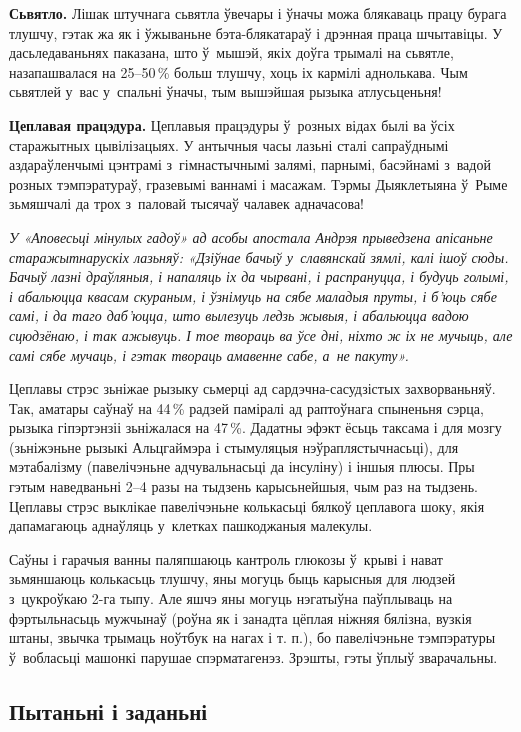 \textbf{Сьвятло.} Лішак штучнага сьвятла ўвечары і ўначы можа блякаваць працу бурага тлушчу, гэтак жа як і ўжываньне бэта-блякатараў і дрэнная праца шчытавіцы. У дасьледаваньнях паказана, што ў~мышэй, якіх доўга трымалі на сьвятле, назапашвалася на 25--50\,\% больш тлушчу, хоць іх кармілі аднолькава. Чым сьвятлей у~вас у~спальні ўначы, тым вышэйшая рызыка атлусьценьня!

\textbf{Цеплавая працэдура.} Цеплавыя працэдуры ў~розных відах былі ва ўсіх старажытных цывілізацыях. У антычныя часы лазьні сталі сапраўднымі аздараўленчымі цэнтрамі з~гімнастычнымі залямі, парнымі, басэйнамі з~вадой розных тэмпэратураў, гразевымі ваннамі і масажам. Тэрмы Дыяклетыяна ў~Рыме зьмяшчалі да трох з~паловай тысячаў чалавек адначасова!

\emph{У «Аповесьці мінулых гадоў» ад асобы апостала Андрэя прыведзена апісаньне старажытнарускіх лазьняў: «Дзіўнае бачыў у~славянскай зямлі, калі ішоў сюды. Бачыў лазні драўляныя, і напаляць іх да чырвані, і распрануцца, і будуць голымі, і абальюцца квасам скураным, і ўзнімуць на сябе маладыя пруты, і б’юць сябе самі, і да таго даб’юцца, што вылезуць ледзь жывыя, і абальюцца вадою сцюдзёнаю, і так ажывуць. І тое твораць ва ўсе дні, ніхто ж іх не мучыць, але самі сябе мучаць, і гэтак твораць амавенне сабе, а~не пакуту».}

Цеплавы стрэс зьніжае рызыку сьмерці ад сардэчна-сасудзістых захворваньняў. Так, аматары саўнаў на 44\,\% радзей паміралі ад раптоўнага спыненьня сэрца, рызыка гіпэртэнзіі зьніжалася на 47\,\%. Дадатны эфэкт ёсьць таксама і для мозгу (зьніжэньне рызыкі Альцгаймэра і стымуляцыя нэўраплястычнасьці), для мэтабалізму (павелічэньне адчувальнасьці да інсуліну) і іншыя плюсы. Пры гэтым наведваньні 2--4 разы на тыдзень карысьнейшыя, чым раз на тыдзень. Цеплавы стрэс выклікае павелічэньне колькасьці бялкоў цеплавога шоку, якія дапамагаюць аднаўляць у~клетках пашкоджаныя малекулы.

Саўны і гарачыя ванны паляпшаюць кантроль глюкозы ў~крыві і нават зьмяншаюць колькасьць тлушчу, яны могуць быць карысныя для людзей з~цукроўкаю 2-га тыпу. Але яшчэ яны могуць нэгатыўна паўплываць на фэртыльнасьць мужчынаў (роўна як і занадта цёплая ніжняя бялізна, вузкія штаны, звычка трымаць ноўтбук на нагах і т. п.), бо павелічэньне тэмпэратуры ў~вобласьці машонкі парушае спэрматагенэз. Зрэшты, гэты ўплыў зварачальны.

\subsection*{Пытаньні і заданьні}

